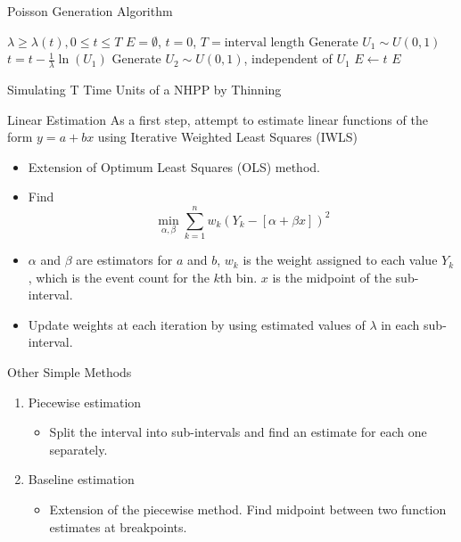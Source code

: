 \documentclass{beamer}
\begin{document}
\begin{frame}{Poisson Generation Algorithm}
  \begin{algorithm}[H]
    \begin{algorithmic}[1]
      \REQUIRE $\lambda\geq \lambda(t), 0 \leq t \leq T$
      \STATE $E=\emptyset$, $t=0$, $T=\text{interval length}$
      \STATE Generate $U_1\sim U(0,1)$
      \STATE $t=t-\frac{1}{\lambda}\ln(U_1)$
      \STATE Generate $U_2\sim U(0,1)$, independent of $U_1$
      \STATE $E \leftarrow t$
      \ENDIF
      \ENDWHILE
      \RETURN $E$
    \end{algorithmic}
    \caption{Simulating T Time Units of a NHPP by Thinning}
    \label{alg:seq}
  \end{algorithm}
\end{frame}

\begin{frame}{Linear Estimation}
  As a first step, attempt to estimate linear functions of the form $y=a+bx$ using Iterative Weighted Least Squares (IWLS)
  \begin{itemize}
  \item Extension of Optimum Least Squares (OLS) method.
  \item Find \[\min_{\alpha,\beta}\sum_{k=1}^{n}w_k(Y_k-[\alpha+\beta x])^2\]
  \item $\alpha$ and $\beta$ are estimators for $a$ and $b$, $w_k$ is the weight assigned to each value $Y_k$, which is the event count for the $k$th bin. $x$ is the midpoint of the sub-interval.
  \item Update weights at each iteration by using estimated values of $\lambda$ in each sub-interval.
  \end{itemize}
\end{frame}

\begin{frame}{Other Simple Methods}
  \begin{enumerate}
  \item Piecewise estimation
    \begin{itemize}
    \item Split the interval into sub-intervals and find an estimate for each one separately.
    \end{itemize}
  \item Baseline estimation
    \begin{itemize}
    \item Extension of the piecewise method. Find midpoint between two function estimates at breakpoints.
    \end{itemize}
  \end{enumerate}
\end{frame}
\end{document}
